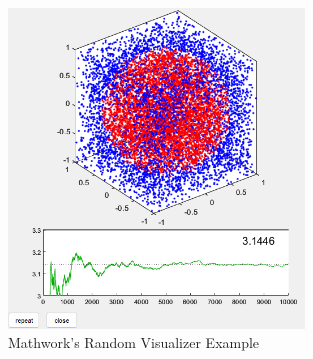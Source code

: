 \begin{figure}[H]
    \centering
    \includegraphics[width=0.7\textwidth]{Include/Images/Thesis/Development/Visualizers/RANDOMNESS/Mathworks.Random.Ex1.png}
    \caption{Mathwork's Random Visualizer Example}
    \label{fig:Mathwork's Random Visualizer Example}
\end{figure}

